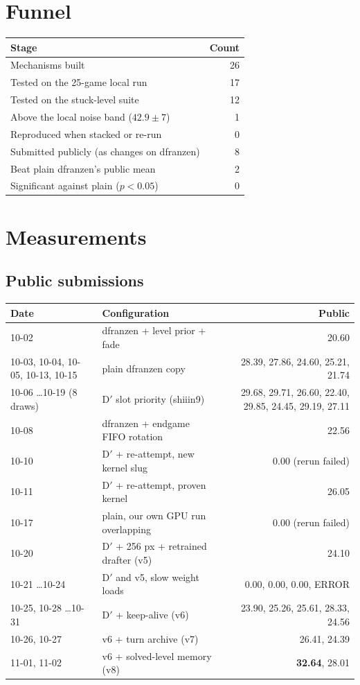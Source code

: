 \documentclass[11pt]{article}
\begin{document}
\section{Funnel}
\begin{tabular}{lr}
\toprule
Stage & Count \\
\midrule
Mechanisms built & 26 \\
Tested on the 25-game local run & 17 \\
Tested on the stuck-level suite & 12 \\
Above the local noise band ($42.9 \pm 7$) & 1 \\
Reproduced when stacked or re-run & 0 \\
Submitted publicly (as changes on dfranzen) & 8 \\
Beat plain dfranzen's public mean & 2 \\
Significant against plain ($p<0.05$) & 0 \\
\bottomrule
\end{tabular}

\section{Measurements}
\subsection*{Public submissions}
\begin{tabular}{llr}
\toprule
Date & Configuration & Public \\
\midrule
10-02 & dfranzen + level prior + fade & 20.60 \\
10-03, 10-04, 10-05, 10-13, 10-15 & plain dfranzen copy & 28.39, 27.86, 24.60, 25.21, 21.74 \\
10-06 \dots 10-19 (8 draws) & D$'$ slot priority (shiiin9) & 29.68, 29.71, 26.60, 22.40, 29.85, 24.45, 29.19, 27.11 \\
10-08 & dfranzen + endgame FIFO rotation & 22.56 \\
10-10 & D$'$ + re-attempt, new kernel slug & 0.00 (rerun failed) \\
10-11 & D$'$ + re-attempt, proven kernel & 26.05 \\
10-17 & plain, our own GPU run overlapping & 0.00 (rerun failed) \\
10-20 & D$'$ + 256 px + retrained drafter (v5) & 24.10 \\
10-21 \dots 10-24 & D$'$ and v5, slow weight loads & 0.00, 0.00, 0.00, ERROR \\
10-25, 10-28 \dots 10-31 & D$'$ + keep-alive (v6) & 23.90, 25.26, 25.61, 28.33, 24.56 \\
10-26, 10-27 & v6 + turn archive (v7) & 26.41, 24.39 \\
11-01, 11-02 & v6 + solved-level memory (v8) & \textbf{32.64}, 28.01 \\
\bottomrule
\end{tabular}
\end{document}
